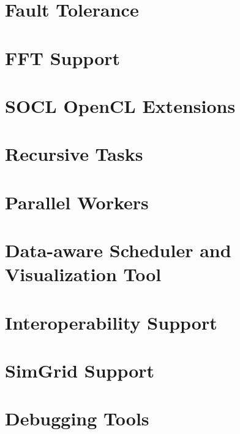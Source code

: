 \chapter{Fault Tolerance}
\label{FaultTolerance}
\hypertarget{FaultTolerance}{}


\chapter{FFT Support}
\label{FFTSupport}
\hypertarget{FFTSupport}{}


\chapter{SOCL OpenCL Extensions}
\label{SOCLOpenclExtensions}
\hypertarget{SOCLOpenclExtensions}{}


\chapter{Recursive Tasks}
\label{RecursiveTasks}
\hypertarget{RecursiveTasks}{}


\chapter{Parallel Workers}
\label{ParallelWorker}
\hypertarget{ParallelWorker}{}


\chapter{Data-aware Scheduler and Visualization Tool}
\label{Darts}
\hypertarget{Darts}{}


\chapter{Interoperability Support}
\label{InteropSupport}
\hypertarget{InteropSupport}{}


\chapter{SimGrid Support}
\label{SimGridSupport}
\hypertarget{SimGridSupport}{}


\chapter{Debugging Tools}
\label{DebuggingTools}
\hypertarget{DebuggingTools}{}


